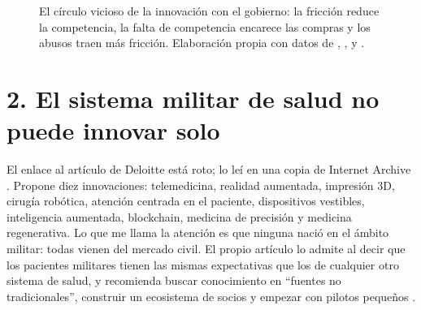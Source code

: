 \documentclass[11pt,letterpaper]{article}
\begin{document}
\begin{figure}[H]
\centering
{}
\caption{El círculo vicioso de la innovación con el gobierno: la fricción
reduce la competencia, la falta de competencia encarece las compras y los
abusos traen más fricción. Elaboración propia con datos de
\textcite{somers2019}, \textcite{gao2021}, \textcite{dod2022} y
\textcite{dodig2019}.}
\label{fig:ciclo}
\end{figure}

\section*{2. El sistema militar de salud no puede innovar solo}

El enlace al artículo de Deloitte está roto; lo leí en una copia de
Internet Archive \parencite{deloitte2020}. Propone diez innovaciones:
telemedicina, realidad aumentada, impresión 3D, cirugía robótica, atención
centrada en el paciente, dispositivos vestibles, inteligencia aumentada,
blockchain, medicina de precisión y medicina regenerativa. Lo que me llama la
atención es que ninguna nació en el ámbito militar: todas vienen del mercado
civil. El propio artículo lo admite al decir que los pacientes militares
tienen las mismas expectativas que los de cualquier otro sistema de salud, y
recomienda buscar conocimiento en \enquote{fuentes no tradicionales},
construir un ecosistema de socios y empezar con pilotos pequeños
\parencite{deloitte2020}.
\end{document}
